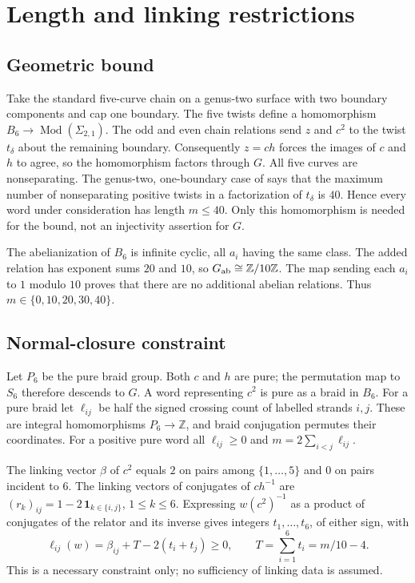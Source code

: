 \documentclass[11pt]{article}
\newcommand{\B}{B_6}
\newcommand{\Mod}{\operatorname{Mod}}
\begin{document}
\section{Length and linking restrictions}

\subsection{Geometric bound}
Take the standard five-curve chain on a genus-two surface with two
boundary components and cap one boundary. The five twists define
a homomorphism \(\B\to\Mod(\Sigma_{2,1})\). The odd and even chain
relations send \(z\) and \(c^2\) to the twist \(t_\delta\) about the
remaining boundary. Consequently \(z=ch\) forces the images of
\(c\) and \(h\) to agree, so the homomorphism factors through \(G\).
All five curves are nonseparating. The genus-two, one-boundary case
of \cite[Theorem A]{BMVHM} says that the maximum number of
nonseparating positive twists in a factorization of \(t_\delta\)
is \(40\). Hence every word under consideration has length \(m\leq40\).
Only this homomorphism is needed for the bound, not an injectivity
assertion for \(G\).

The abelianization of \(\B\) is infinite cyclic, all \(a_i\) having
the same class. The added relation has exponent sums \(20\) and
\(10\), so \(G_{\rm ab}\cong\mathbb Z/10\mathbb Z\).
The map sending each \(a_i\) to \(1\) modulo \(10\) proves that
there are no additional abelian relations.
Thus \(m\in\{0,10,20,30,40\}\).

\subsection{Normal-closure constraint}
Let \(P_6\) be the pure braid group. Both \(c\) and \(h\) are pure;
the permutation map to \(S_6\) therefore descends to \(G\).
A word representing \(c^2\) is pure as a braid in \(\B\).
For a pure braid let \(\ell_{ij}\) be half the signed crossing
count of labelled strands \(i,j\). These are integral homomorphisms
\(P_6\to\mathbb Z\), and braid conjugation permutes their coordinates.
For a positive pure word all \(\ell_{ij}\geq0\) and
\(m=2\sum_{i<j}\ell_{ij}\).

The linking vector \(\beta\) of \(c^2\) equals \(2\) on pairs among
\(\{1,\ldots,5\}\) and \(0\) on pairs incident to \(6\).
The linking vectors of conjugates of \(ch^{-1}\) are
\((r_k)_{ij}=1-2\,\mathbf1_{k\in\{i,j\}}\), \(1\leq k\leq6\).
Expressing \(w(c^2)^{-1}\) as a product of conjugates of the relator
and its inverse gives integers \(t_1,\ldots,t_6\), of either sign,
with
\begin{equation}\label{link}
 \ell_{ij}(w)=\beta_{ij}+T-2(t_i+t_j)\geq0,\qquad
 T=\sum_{i=1}^6t_i=m/10-4.
\end{equation}
This is a necessary constraint only; no sufficiency of linking
data is assumed.
\end{document}
